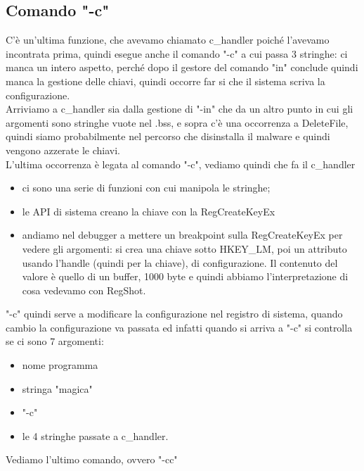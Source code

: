 \documentclass[12pt, oneside]{extbook}
\begin{document}
\subsection{Comando "-c"}
C'è un'ultima funzione, che avevamo chiamato c\_handler poiché l'avevamo incontrata prima, quindi esegue anche il comando "-c" a cui passa 3 stringhe: ci manca un intero aspetto, perché dopo il gestore del comando "in" conclude quindi manca la gestione delle chiavi, quindi occorre far si che il sistema scriva la configurazione.\\Arriviamo a c\_handler sia dalla gestione di "-in" che da un altro punto in cui gli argomenti sono stringhe vuote nel .bss, e sopra c'è una occorrenza a DeleteFile, quindi siamo probabilmente nel percorso che disinstalla il malware e quindi vengono azzerate le chiavi.\\L'ultima occorrenza è legata al comando "-c", vediamo quindi che fa il c\_handler
\begin{itemize}
\item ci sono una serie di funzioni con cui manipola le stringhe;
\item le API di sistema creano la chiave con la RegCreateKeyEx
\item andiamo nel debugger a mettere un breakpoint sulla RegCreateKeyEx per vedere gli argomenti: si crea una chiave sotto HKEY\_LM, poi un attributo usando l'handle (quindi per la chiave), di configurazione. Il contenuto del valore è quello di un buffer, 1000 byte e quindi abbiamo l'interpretazione di cosa vedevamo con RegShot.
\end{itemize}
"-c" quindi serve a modificare la configurazione nel registro di sistema, quando cambio la configurazione va passata ed infatti quando si arriva a "-c" si controlla se ci sono 7 argomenti:
\begin{itemize}
\item nome programma
\item stringa "magica"
\item "-c"
\item le 4 stringhe passate a c\_handler.
\end{itemize}
Vediamo l'ultimo comando, ovvero "-cc"
\end{document}
